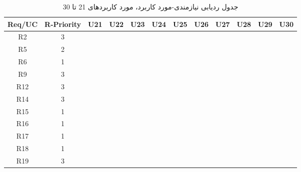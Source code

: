 \documentclass[12pt]{article}
\begin{document}
	\newpage
	\begin{longtable}{|c|c|c|c|c|c|c|c|c|c|c|c|}
		\caption{جدول ردیابی نیازمندی-مورد کاربرد، مورد کاربردهای 21 تا 30}
		\label{tab:req-uc-21-30}
		\endfirsthead
		\endhead
		\hline
		Req/UC      & R-Priority & U21      & U22      & U23      & U24      & U25      & U26      & U27      & U28      & U29      & U30      \\
		\hline
		R2          & 3          &           &           &           &           &           &           &           &           &           &           \\
		\hline
		R5          & 2          &           &           &           &           &           &           &           &           &           &           \\
		\hline
		R6          & 1          &           &           &           &           &           &           &           &           &           &           \\
		\hline
		R9          & 3          &           &           &           &           &           &           &           &           &           &           \\
		\hline
		R12         & 3          &           &           &           &           &           &           &           &           &           &           \\
		\hline
		R14         & 3          &           &           &           &           &           &           &           &           &           &           \\
		\hline
		R15         & 1          &           &           &           &           &           &           &           &           &           &           \\
		\hline
		R16         & 1          &           &           &           &           &           &           &           &           &           &           \\
		\hline
		R17         & 1          &           &           &           &           &           &           &           &           &           &           \\
		\hline
		R18         & 1          &           &           &           &           &           &           &           &           &           &           \\
		\hline
		R19         & 3          &           &           &           &           &           &           &           &           &           &           \\
		\hline

\end{longtable}
\end{document}
